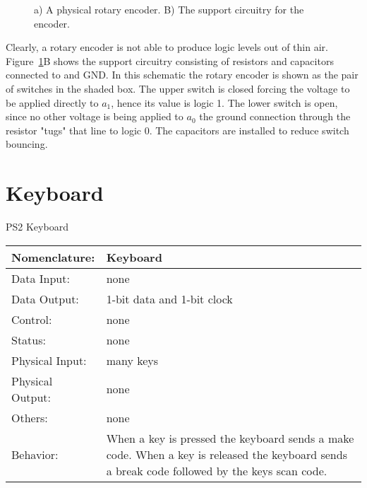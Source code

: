                 \begin{figure}[ht]
                \caption{a) A physical rotary encoder.  B) The support circuitry for
            the encoder.}
            \label{fig:commonPeripheralComponentsencoder}
        \end{figure}

        Clearly, a rotary encoder is not able to produce logic levels out
        of thin air.   Figure~\ref{fig:commonPeripheralComponentsencoder}B shows the support
        circuitry consisting of resistors and capacitors connected to
        \VCC and GND.  In this schematic the rotary encoder is shown as the
        pair of switches in the shaded box.  The upper switch is closed
        forcing the voltage \VCC to be applied directly to $a_1$, hence its
        value is logic 1.  The lower switch is open, since no other voltage
        is being applied to $a_0$ the ground connection through the resistor
        "tugs" that line to logic 0.  The capacitors are installed to reduce
        switch bouncing.

        \section{Keyboard}
            \label{page:keyboad}
            \begin{buildingblock}{PS2 Keyboard}
                \begin{tabular}{|l|p{3.5in}|} \hline
                    Nomenclature:  & Keyboard                           \\ \hline
                    Data Input:    & none        \\ \hline
                    Data Output:   & 1-bit data and 1-bit clock   \\ \hline
                    Control:       & none           \\ \hline
                    Status:        & none                                   \\ \hline
                    Physical Input:& many keys        \\ \hline
                    Physical Output:& none        \\ \hline
                    Others:        & none                   \\ \hline
                    Behavior:      & When a key is pressed the keyboard sends a make code.
                    When a key is released the keyboard sends a break code followed by the
                    keys scan code. \\ \hline
                \end{tabular}
            \end{buildingblock}

